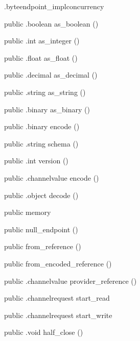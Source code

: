 \begin{CrexxClass}{.byteendpoint\_impl}{concurrency}
\begin{Members}
    \Method
      {public}
      {.boolean}
      {as\_boolean}
      {()}

    \Method
      {public}
      {.int}
      {as\_integer}
      {()}

    \Method
      {public}
      {.float}
      {as\_float}
      {()}

    \Method
      {public}
      {.decimal}
      {as\_decimal}
      {()}

    \Method
      {public}
      {.string}
      {as\_string}
      {()}

    \Method
      {public}
      {.binary}
      {as\_binary}
      {()}

    \Method
      {public}
      {.binary}
      {encode}
      {()}

    \Method
      {public}
      {.string}
      {schema}
      {()}

    \Method
      {public}
      {.int}
      {version}
      {()}

    \Method
      {public}
      {.channelvalue}
      {encode}
      {()}

    \Method
      {public}
      {.object}
      {decode}
      {()}

    \Factory
      {public}
      {memory}
      {}

    \Factory
      {public}
      {null\_endpoint}
      {()}

    \Factory
      {public}
      {from\_reference}
      {()}

    \Factory
      {public}
      {from\_encoded\_reference}
      {()}

    \Method
      {public}
      {.channelvalue}
      {provider\_reference}
      {()}

    \Method
      {public}
      {.channelrequest}
      {start\_read}
      {}

    \Method
      {public}
      {.channelrequest}
      {start\_write}
      {}

    \Method
      {public}
      {.void}
      {half\_close}
      {()}


\end{Members}
\end{CrexxClass}

